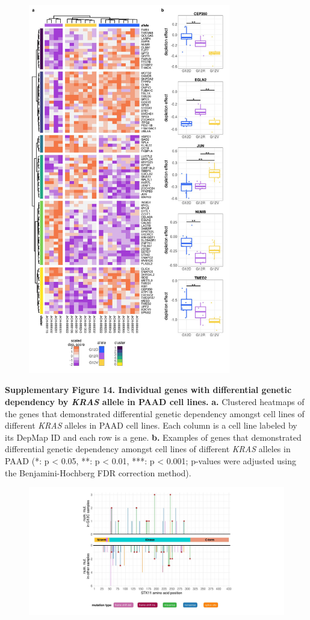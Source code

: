\documentclass[english, 10pt, letterpaper]{article}
\newcommand{\KRAS}{\emph{KRAS}}
\begin{document}
\begin{figure}[h!]
\centering
\includegraphics[width=88mm]{figures/Supp_Fig_14.jpeg}
\label{sfig:paad-dependency-heatmap}
\end{figure}

\noindent \textbf{Supplementary Figure 14. Individual genes with differential genetic dependency by \KRAS{} allele in PAAD cell lines.}
\textbf{a.} Clustered heatmaps of the genes that demonstrated differential genetic dependency amongst cell lines of different \KRAS{} alleles in PAAD cell lines. Each column is a cell line labeled by its DepMap ID and each row is a gene.
\textbf{b.} Examples of genes that demonstrated differential genetic dependency amongst cell lines of different \KRAS{} alleles in PAAD (*: p < 0.05, **: p < 0.01, ***: p < 0.001; p-values were adjusted using the Benjamini-Hochberg FDR correction method).
\newpage


\begin{figure}[h!]
\centering
\includegraphics[width=180mm]{figures/Supp_Fig_15.jpeg}
\label{sfig:stk11-mutation-lollipop}
\end{figure}
\end{document}
